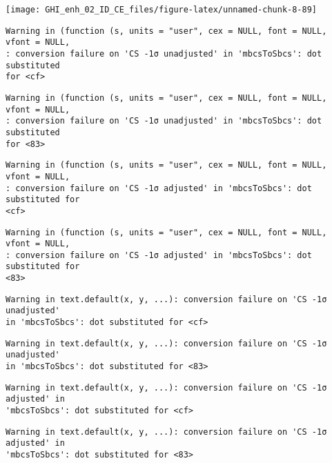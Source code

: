 \documentclass[
  10pt,
  a4paper,oneside]{article}
\begin{document}
\begin{center}\texttt{[image: GHI\_enh\_02\_ID\_CE\_files/figure-latex/unnamed-chunk-8-89]} \end{center}

\begin{verbatim}
Warning in (function (s, units = "user", cex = NULL, font = NULL, vfont = NULL,
: conversion failure on 'CS -1σ unadjusted' in 'mbcsToSbcs': dot substituted
for <cf>
\end{verbatim}

\begin{verbatim}
Warning in (function (s, units = "user", cex = NULL, font = NULL, vfont = NULL,
: conversion failure on 'CS -1σ unadjusted' in 'mbcsToSbcs': dot substituted
for <83>
\end{verbatim}

\begin{verbatim}
Warning in (function (s, units = "user", cex = NULL, font = NULL, vfont = NULL,
: conversion failure on 'CS -1σ adjusted' in 'mbcsToSbcs': dot substituted for
<cf>
\end{verbatim}

\begin{verbatim}
Warning in (function (s, units = "user", cex = NULL, font = NULL, vfont = NULL,
: conversion failure on 'CS -1σ adjusted' in 'mbcsToSbcs': dot substituted for
<83>
\end{verbatim}

\begin{verbatim}
Warning in text.default(x, y, ...): conversion failure on 'CS -1σ unadjusted'
in 'mbcsToSbcs': dot substituted for <cf>
\end{verbatim}

\begin{verbatim}
Warning in text.default(x, y, ...): conversion failure on 'CS -1σ unadjusted'
in 'mbcsToSbcs': dot substituted for <83>
\end{verbatim}

\begin{verbatim}
Warning in text.default(x, y, ...): conversion failure on 'CS -1σ adjusted' in
'mbcsToSbcs': dot substituted for <cf>
\end{verbatim}

\begin{verbatim}
Warning in text.default(x, y, ...): conversion failure on 'CS -1σ adjusted' in
'mbcsToSbcs': dot substituted for <83>
\end{verbatim}
\end{document}
